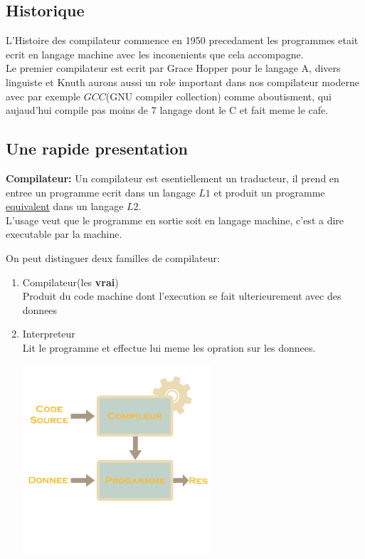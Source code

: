 \documentclass[a4paper,11pt]{article}
\begin{document}
     \subsection{Historique}
        L'Histoire des compilateur commence en 1950 precedament les programmes etait ecrit en langage machine avec les inconenients que cela accompagne.\\
        Le premier compilateur est ecrit par Grace Hopper pour le langage A, divers linguiste et Knuth aurons aussi un role important dans nos compilateur moderne avec par exemple $GCC$(GNU compiler collection) comme aboutisment, qui aujaud'hui compile pas moins de 7 langage dont le C et fait meme le cafe.
        \\
      \subsection{Une rapide presentation}
\begin{center}
      \textbf{\color{LightOrangeHaf}Compilateur:}
          Un compilateur est esentiellement un traducteur, il prend en entree un programme ecrit dans un langage $L1$ et produit un programme \underline{equivalent} dans un langage $L2$.\\
          L'usage veut que le programme en sortie soit en langage machine, c'est a dire executable par la machine.
    \end{center}
    On peut distinguer deux familles de compilateur:
    \begin{enumerate}
      \item Compilateur(les \textbf{vrai})\\ Produit du code machine dont l'execution se fait ulterieurement avec des donnees
      \item Interpreteur\\ Lit le programme et effectue lui meme les opration sur les donnees.
    \begin{center}
     \hfill\includegraphics[width=7cm]{fig1.png}\hspace*{\fill}
    \end{center}
    \end{enumerate}
\end{document}
